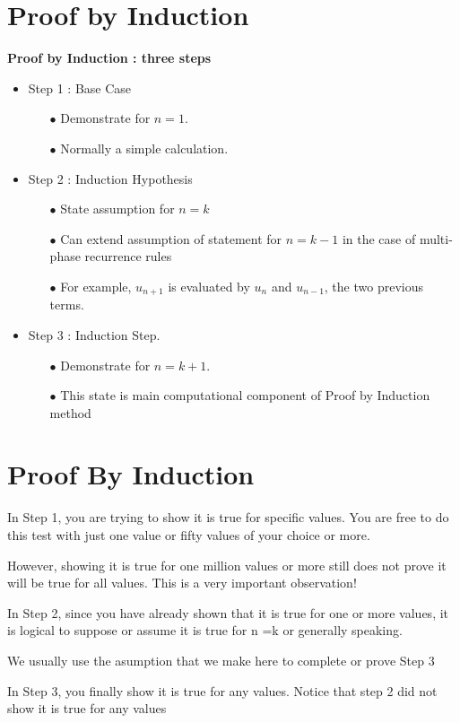 \section{Proof by Induction}


\textbf{Proof by Induction :  three steps}
\begin{itemize}
\item Step 1 : Base Case
\begin{itemize}
\item[$\bullet$]  Demonstrate for $n=1$.
\item[$\bullet$]  Normally a simple calculation.
\end{itemize}
\item Step 2 : Induction Hypothesis 

\begin{itemize}
\item[$\bullet$] State assumption for $n=k$
\item[$\bullet$]  Can extend assumption of statement for $n=k-1$ in the case of multi-phase recurrence rules 
\item[$\bullet$] For example, $u_{n+1}$ is evaluated by $u_{n}$ and $u_{n-1}$, the two previous terms.
\end{itemize}

\item Step 3 : Induction Step.
\begin{itemize}
\item[$\bullet$]  Demonstrate for $n=k+1$.
\item[$\bullet$] 
This state is main computational component of Proof by Induction method
\end{itemize}
\end{itemize}




\section{Proof By Induction}
In Step 1, you are trying to show it is true for specific values. You are free to do this test with just one value or fifty values of your choice or more.

However, showing it is true for one million values or more still does not prove it will be true for all values. This is a very important observation!

In Step 2, since you have already shown that it is true for one or more values, it is logical to suppose or assume it is true for n =k or generally speaking.

We usually use the asumption that we make here to complete or prove Step  3

In Step 3, you finally show it is true for any values. Notice that step 2 did not show it is true for any values
